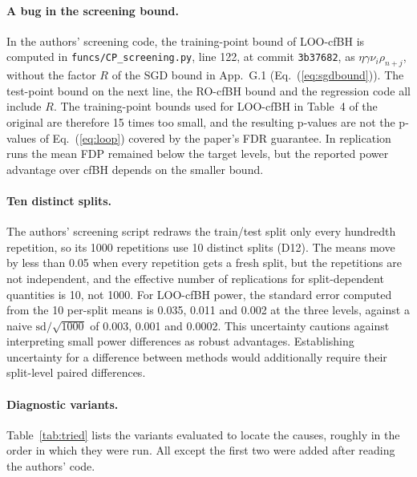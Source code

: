 \paragraph{A bug in the screening bound.} In the authors' screening code\supercite{authorscode}, the training-point
bound of LOO-cfBH is computed in \texttt{funcs/CP\_screening.py}, line 122, at commit \texttt{3b37682}, as
$\eta\gamma\nu_i\rho_{n+j}$, without the factor $R$ of the SGD bound in App.~G.1 (Eq.~(\ref{eq:sgdbound})). The
test-point bound on the next line, the RO-cfBH bound and the regression code all include $R$. The training-point
bounds used for LOO-cfBH in Table~4 of the original are therefore 15 times too small, and the resulting p-values are
not the p-values of Eq.~(\ref{eq:loop}) covered by the paper's FDR guarantee. In replication runs the mean FDP remained below the target levels, but the reported power advantage over cfBH depends on the smaller bound.

\paragraph{Ten distinct splits.} The authors' screening script redraws the train/test split only every hundredth
repetition, so its 1000 repetitions use 10 distinct splits (D12). The means move by less than 0.05 when every
repetition gets a fresh split, but the repetitions are not independent, and the effective number of replications for
split-dependent quantities is 10, not 1000. For LOO-cfBH power, the standard error computed from the 10 per-split
means is 0.035, 0.011 and 0.002 at the three levels, against a naive $\mathrm{sd}/\sqrt{1000}$ of 0.003, 0.001 and
0.0002. This uncertainty cautions against interpreting small power differences as robust advantages. Establishing uncertainty for a difference between methods would additionally require their split-level paired differences.

\paragraph{Diagnostic variants.} Table~\ref{tab:tried} lists the variants evaluated to locate the causes, roughly in the order
in which they were run. All except the first two were added after reading the authors' code.

